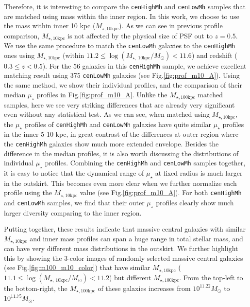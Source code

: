 \documentclass{emulateapj}
\def\rbcg{\texttt{cenHighMh}}
\def\nbcg{\texttt{cenLowMh}}
\def\minn{{$M_{\star,10\mathrm{kpc}}$}}
\def\mtot{{$M_{\star,100\mathrm{kpc}}$}}
\def\mden{{$\mu_{\star}$}}
\begin{document}
\begin{CJK*}{UTF8}{gbsn}
    Therefore, it is interesting to compare the \rbcg{} and \nbcg{} samples that are 
    matched using mass within the inner region.  
    In this work, we choose to use the mass within inner 10 kpc (\minn{}). 
    As we can see in previous profile comparison, \minn{} is not affected by the 
    physical size of PSF out to $z=0.5$.  
    We use the same procedure to match the \nbcg{} galaxies to the \rbcg{} ones using 
    \minn{} (within $11.2 \leq \log (M_{\star,\ 10\mathrm{kpc}}/M_{\odot}) < 11.6$) 
    and redshift ($0.3 \leq z < 0.5$).  
    For the 56 galaxies in this \rbcg{} sample, we achieve excellent matching 
    result using 375 \nbcg{} galaxies (see Fig.\ref{fig:prof_m10_A}).  
    Using the same method, we show their individual profiles, and the comparison of 
    their median \mden{} profiles in Fig.\ref{fig:prof_m10_A}.  
    Unlike the \mtot{} matched samples, here we see very striking differences that 
    are already very significant even without any statistical test.     
    As we can see, when matched using \minn{}, the \mden{} profiles of \rbcg{} and 
    \nbcg{} galaxies have quite similar \mden{} profiles in the inner 5-10 kpc, 
    in great contrast of the differences at outer region where the \rbcg{} galaxies 
    show much more extended envelope.      
    Besides the difference in the median profiles, it is also worth discussing 
    the distributions of individual \mden{} profiles. 
    Combining the \rbcg{} and \nbcg{} samples together, it is easy to notice that 
    the dynamical range of \mden{} at fixed radius is much larger in the outskirt. 
    This becomes even more clear when we further normalize each profile using 
    the \minn{} value (see Fig.\ref{fig:prof_m10_A}).   
    For both \rbcg{} and \nbcg{} samples, we find that their outer \mden{} profiles 
    clearly show much larger diversity comparing to the inner region. 
    
    Putting together, these results indicate that massive central galaxies with 
    similar \minn{} and inner mass profiles can span a huge range in total stellar 
    mass, and can have very different mass distributions in the outskirt. 
    We further highlight this by showing the 3-color images of randomly selected 
    massive central galaxies (see Fig.\ref{fig:m100_m10_color}) that 
    have similar \minn{} 
    ($11.1 \leq \log (M_{\star,\ 10\mathrm{kpc}}/M_{\odot}) < 11.2$)
    but different \mtot{}.   
    From the top-left to the bottom-right, the \mtot{} of these galaxies increases
    from $10^{11.22} M_{\odot}$ to $10^{11.75} M_{\odot}$. 
    

\end{CJK*}
\end{document}
